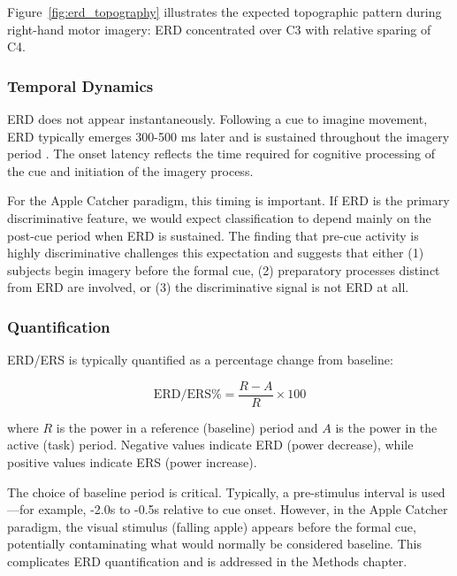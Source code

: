 Figure~\ref{fig:erd_topography} illustrates the expected topographic pattern during right-hand motor imagery: ERD concentrated over C3 with relative sparing of C4.


\subsubsection{Temporal Dynamics}

ERD does not appear instantaneously. Following a cue to imagine movement, ERD typically emerges 300-500 ms later and is sustained throughout the imagery period \cite{pfurtscheller2001motor}. The onset latency reflects the time required for cognitive processing of the cue and initiation of the imagery process.

For the Apple Catcher paradigm, this timing is important. If ERD is the primary discriminative feature, we would expect classification to depend mainly on the post-cue period when ERD is sustained. The finding that pre-cue activity is highly discriminative challenges this expectation and suggests that either (1) subjects begin imagery before the formal cue, (2) preparatory processes distinct from ERD are involved, or (3) the discriminative signal is not ERD at all.

\subsubsection{Quantification}

ERD/ERS is typically quantified as a percentage change from baseline:

\begin{equation}
    \text{ERD/ERS\%} = \frac{R - A}{R} \times 100
    \label{eq:erds}
\end{equation}

where $R$ is the power in a reference (baseline) period and $A$ is the power in the active (task) period. Negative values indicate ERD (power decrease), while positive values indicate ERS (power increase).

The choice of baseline period is critical. Typically, a pre-stimulus interval is used—for example, -2.0s to -0.5s relative to cue onset. However, in the Apple Catcher paradigm, the visual stimulus (falling apple) appears before the formal cue, potentially contaminating what would normally be considered baseline. This complicates ERD quantification and is addressed in the Methods chapter.


